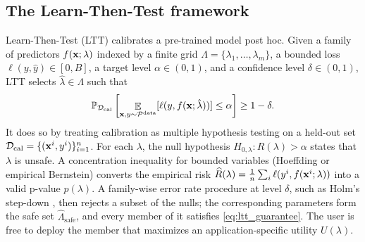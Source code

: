 \subsection{The Learn-Then-Test framework}
\label{sec:ltt}
Learn-Then-Test (LTT) \citep{angelopoulos2025learn} calibrates a pre-trained model post hoc. Given a family of predictors $f(\mathbf{x};\lambda)$ indexed by a finite grid $\Lambda = \{\lambda_1,\dots,\lambda_m\}$, a bounded loss $\ell(y,\hat y) \in [0,B]$, a target level $\alpha \in (0,1)$, and a confidence level $\delta \in (0,1)$, LTT selects $\hat\lambda \in \Lambda$ such that
\begin{align}
\label{eq:ltt_guarantee}
    \mathbb{P}_{\mathcal{D}_{\text{cal}}}\left[ \mathop{\mathbb{E}}_{\mathbf{x}, y \sim \mathcal{P}^{\text{data}}}[\ell(y, f(\mathbf{x}; \hat{\lambda}))] \le \alpha \right] \ge 1 - \delta.
\end{align}
It does so by treating calibration as multiple hypothesis testing on a held-out set $\mathcal{D}_{\text{cal}} = \{(\mathbf{x}^i, y^i)\}_{i=1}^n$. For each $\lambda$, the null hypothesis $H_{0,\lambda} : R(\lambda) > \alpha$ states that $\lambda$ is unsafe. A concentration inequality for bounded variables (Hoeffding or empirical Bernstein) converts the empirical risk $\widehat{R}(\lambda) = \frac{1}{n}\sum_{i} \ell(y^i, f(\mathbf{x}^i; \lambda))$ into a valid p-value $p(\lambda)$. A family-wise error rate procedure at level $\delta$, such as Holm's step-down \citep{holm1979simple}, then rejects a subset of the nulls; the corresponding parameters form the safe set $\widehat{\Lambda}_{\text{safe}}$, and every member of it satisfies \cref{eq:ltt_guarantee}. The user is free to deploy the member that maximizes an application-specific utility $U(\lambda)$.

